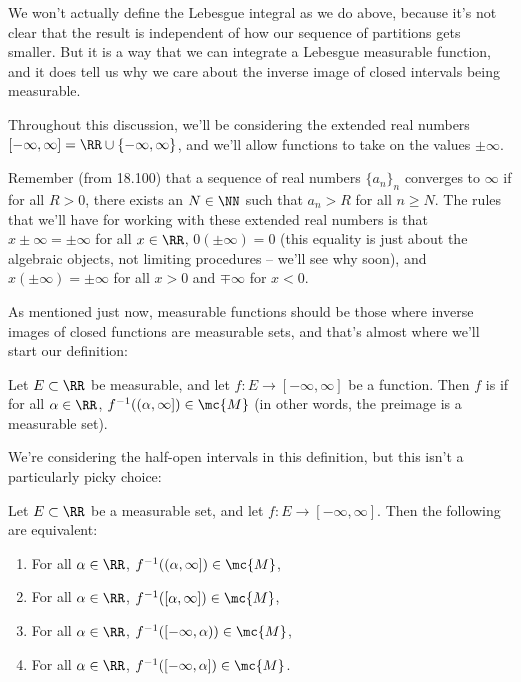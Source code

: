 We won't actually define the Lebesgue integral as we do above, because it's not clear that the result is independent of how our sequence of partitions gets smaller. But it is a way that we can integrate a Lebesgue measurable function, and it does tell us why we care about the inverse image of closed intervals being measurable. 

\begin{fact}
Throughout this discussion, we'll be considering the extended real numbers $[-\infty, \infty] = \RR \cup \{-\infty, \infty\}$, and we'll allow functions to take on the values $\pm \infty$. 
\end{fact}

Remember (from 18.100) that a sequence of real numbers $\{a_n\}_n$ converges to $\infty$ if for all $R > 0$, there exists an $N \in \NN$ such that $a_n > R$ for all $n \ge N$. The rules that we'll have for working with these extended real numbers is that $x \pm \infty = \pm \infty$ for all $x \in \RR$, $0 (\pm \infty) = 0$ (this equality is just about the algebraic objects, not limiting procedures -- we'll see why soon), and $x(\pm \infty) = \pm \infty$ for all $x > 0$ and $\mp \infty$ for $x < 0$.

As mentioned just now, measurable functions should be those where inverse images of closed functions are measurable sets, and that's almost where we'll start our definition:

\begin{definition}
Let $E \subset \RR$ be measurable, and let $f: E \to [-\infty, \infty]$ be a function. Then $f$ is  if for all $\alpha \in \RR$, $f^{-1}((\alpha, \infty]) \in \mc{M}$ (in other words, the preimage is a measurable set).
\end{definition}

We're considering the half-open intervals in this definition, but this isn't a particularly picky choice:

\begin{theorem}\label{fourmeasureequiv}
Let $E \subset \RR$ be a measurable set, and let $f: E \to [-\infty, \infty]$. Then the following are equivalent:
\begin{enumerate}
\item For all $\alpha \in \RR$, $f^{-1}((\alpha, \infty]) \in \mc{M}$,
\item For all $\alpha \in \RR$, $f^{-1}([\alpha, \infty]) \in \mc{M}$,
\item For all $\alpha \in \RR$, $f^{-1}([-\infty, \alpha)) \in \mc{M}$,
\item For all $\alpha \in \RR$, $f^{-1}([-\infty, \alpha]) \in \mc{M}$.
\end{enumerate}
\end{theorem}

